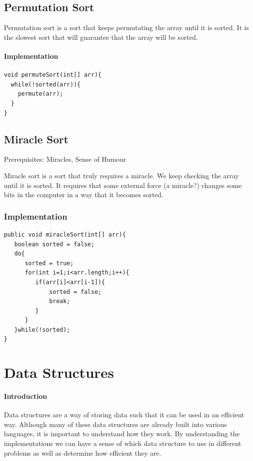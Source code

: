\documentclass[11pt,oneside]{book}
\begin{document}
\section{Permutation Sort}

Permutation sort is a sort that keeps permutating the array until it is sorted. It is the slowest sort that will guarantee that the array will be sorted.

\subsubsection{Implementation}

\begin{lstlisting}
void permuteSort(int[] arr){
  while(!sorted(arr)){
    permute(arr);
  }
}
\end{lstlisting}
\section{Miracle Sort}

Prerequisites: Miracles, Sense of Humour

Miracle sort is a sort that truly requires a miracle. We keep checking the array until it is sorted. It requires that some external force (a miracle?) changes some bits in the computer in a way that it becomes sorted.

\subsection{Implementation}

\begin{lstlisting}
public void miracleSort(int[] arr){
   boolean sorted = false;
   do{
      sorted = true;
      for(int i=1;i<arr.length;i++){
         if(arr[i]<arr[i-1]){
             sorted = false;
             break;
         }
      }
   }while(!sorted);
}
\end{lstlisting}
\chapter{Data Structures}\subsubsection{Introduction}

Data structures are a way of storing data such that it can be used in an efficient way. Although many of these data structures are already built into various languages, it is important to understand how they work. By understanding the implementations we can have a sense of which data structure to use in different problems as well as determine how efficient they are.
\end{document}

